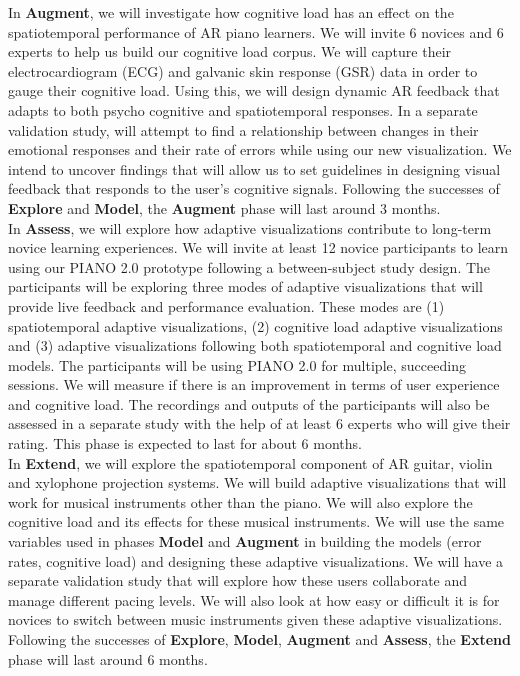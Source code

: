 \documentclass[manuscript,screen]{acmart}
\begin{document}
In \textbf{Augment}, we will investigate how cognitive load has an effect on the spatiotemporal performance of AR piano learners. We will invite 6 novices and 6 experts to help us build our cognitive load corpus. We will capture their electrocardiogram (ECG) and galvanic skin response (GSR) data in order to gauge their cognitive load. Using this, we will design dynamic AR feedback that adapts to both psycho cognitive and spatiotemporal responses. In a separate validation study, will attempt to find a relationship between changes in their emotional responses and their rate of errors while using our new visualization. We intend to uncover findings that will allow us to set guidelines in designing visual feedback that responds to the user's cognitive signals. Following the successes of \textbf{Explore} and \textbf{Model}, the \textbf{Augment} phase will last around 3 months. \\

In \textbf{Assess}, we will explore how adaptive visualizations contribute to long-term novice learning experiences. We will invite at least 12 novice participants to learn using our PIANO 2.0 prototype following a between-subject study design. The participants will be exploring three modes of adaptive visualizations that will provide live feedback and performance evaluation. These modes are (1) spatiotemporal adaptive visualizations, (2) cognitive load adaptive visualizations and (3) adaptive visualizations following both spatiotemporal and cognitive load models. The participants will be using PIANO 2.0 for multiple, succeeding sessions. We will measure if there is an improvement in terms of user experience and cognitive load. The recordings and outputs of the participants will also be assessed in a separate study with the help of at least 6 experts who will give their rating. This phase is expected to last for about 6 months. \\

In \textbf{Extend}, we will explore the spatiotemporal component of AR guitar, violin and xylophone projection systems. We will build adaptive visualizations that will work for musical instruments other than the piano. We will also explore the cognitive load and its effects for these musical instruments. We will use the same variables used in phases \textbf{Model} and \textbf{Augment} in building the models (error rates, cognitive load) and designing these adaptive visualizations. We will have a separate validation study that will explore how these users collaborate and manage different pacing levels. We will also look at how easy or difficult it is for novices to switch between music instruments given these adaptive visualizations. Following the successes of \textbf{Explore}, \textbf{Model}, \textbf{Augment} and \textbf{Assess}, the \textbf{Extend} phase will last around 6 months. \\
\end{document}
